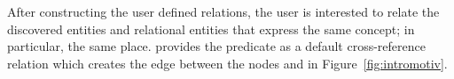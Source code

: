 
After constructing the user defined relations, 
the user is interested to relate the discovered entities and relational entities
that express the same concept; in particular, the same place. 
\framework provides the  predicate as a default cross-reference
relation which creates the edge between the nodes  and 
 in  Figure~\ref{fig:intromotiv}.
